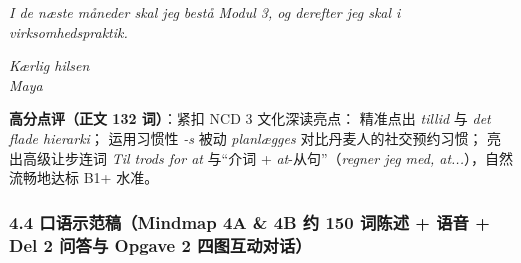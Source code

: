 \begin{answerbox}
\vspace{0.2em}
\textit{I de næste måneder skal jeg bestå Modul 3, og derefter  jeg skal i virksomhedspraktik.}

\vspace{0.2em}
\textit{Kærlig hilsen\\
Maya}

\vspace{0.25em}
\small\textbf{高分点评（正文 132 词）}：紧扣 NCD 3 文化深读亮点： 精准点出 \textit{tillid} 与 \textit{det flade hierarki}； 运用习惯性 \textit{-s} 被动 \textit{planlægges} 对比丹麦人的社交预约习惯； 亮出高级让步连词 \textit{Til trods for at} 与“介词 + \textit{at}-从句”（\textit{regner jeg med, at...}），自然流畅地达标 B1+ 水准。
\end{answerbox}

\subsubsection*{4.4 口语示范稿（Mindmap 4A \& 4B 约 150 词陈述 + 语音 + Del 2 问答与 Opgave 2 四图互动对话）}

